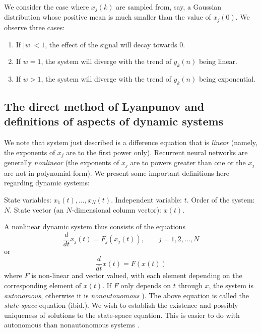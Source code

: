 We consider the case where $x_j(k)$ are sampled from, say, a Gaussian distribution whose positive mean is much smaller than the value of $x_j(0)$. We observe three cases:

\begin{enumerate}
\item If $|w| < 1$, the effect of the signal will decay towards $0$.
\item If $w = 1$, the system will diverge with the trend of $y_k(n)$ being linear. 
\item If $w > 1$, the system will diverge with the trend of $y_k(n)$ being exponential.  
\end{enumerate}

\subsection{The direct method of Lyanpunov and definitions of aspects of dynamic systems}

We note that system just described is a difference equation that is \emph{linear} (namely, the exponents of $x_j$ are to the first power only). Recurrent neural networks are generally \emph{nonlinear} (the exponents of $x_j$ are to powers greater than one \cite[p. 6]{strogatz:2000} or the $x_j$ are not in polynomial form). We present some important definitions here regarding dynamic systems:

\begin{definition}
  State variables: $x_1(t), \ldots, x_N(t)$. Independent variable: $t$. Order of the system: $N$. State vector (an $N$-dimensional column vector): $x(t)$.
\end{definition}

A nonlinear dynamic system thus consists of the equations
%
\begin{equation*}
  \frac{d}{dt}x_j(t) = F_j \left(x_j(t)\right), \qquad j = 1, 2, \ldots, N
\end{equation*}
%
or
%
\begin{equation*}
  \frac{d}{dt}x(t) = F \left(x(t)\right)
\end{equation*}
%
where $F$ is non-linear and vector valued, with each element depending on the corresponding element of $x(t)$. If $F$ only depends on $t$ through $x$, the system is \emph{autonomous}, otherwise it is \emph{nonautonomous} \cite[p. 675]{Haykin:2009:NNC:1213811}). The above equation is called the \emph{state-space} equation (ibid.). We wish to establish the existence and possibly uniqueness of solutions to the state-space equation. This is easier to do with autonomous than nonautonomous systems \cite[p. 180]{DBLP:journals/ai/Beer95}.

